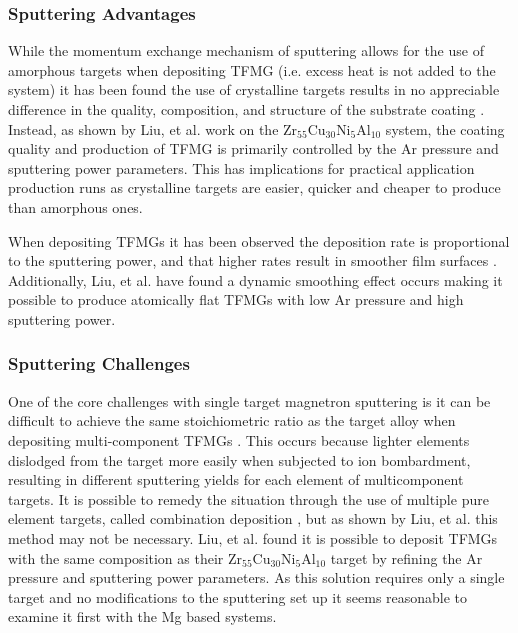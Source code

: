 \documentclass[draft,a4paper,12pt,oneside]{report}%
\begin{document}
\subsubsection{Sputtering Advantages}
While the momentum exchange mechanism of sputtering allows for the use of amorphous targets when depositing TFMG (i.e. excess heat is not added to the system) it has been found the use of crystalline targets results in no appreciable difference in the quality, composition, and structure of the substrate coating \cite{Liu2012}. Instead, as shown by Liu, et al. \cite{Liu2012} work on the Zr$_{55}$Cu$_{30}$Ni$_{5}$Al$_{10}$ system, the coating quality and production of TFMG is primarily controlled by the Ar pressure and sputtering power parameters. This has implications for practical application production runs as crystalline targets are easier, quicker and cheaper to produce than amorphous ones. 

When depositing TFMGs it has been observed the deposition rate is proportional to the sputtering power, and that higher rates result in smoother film surfaces \cite{Cao2013, Liu2012}. Additionally, Liu, et al. \cite{Liu2012} have found a dynamic smoothing effect occurs making it possible to produce atomically flat TFMGs with low Ar pressure and high sputtering power. 

\subsubsection{Sputtering Challenges}
One of the core challenges with single target magnetron sputtering is it can be difficult to achieve the same stoichiometric ratio as the target alloy when depositing multi-component TFMGs \cite{Cao2013, Liu2012, Kondoh2008}. This occurs because lighter elements dislodged from the target more easily when subjected to ion bombardment, resulting in different sputtering yields for each element of multicomponent targets. It is possible to remedy the situation through the use of multiple pure element targets, called combination deposition \cite{Deng2007, Qin2009, Apreutesei2014}, but as shown by Liu, et al. \cite{Liu2012} this method may not be necessary. Liu, et al. \cite{Liu2012} found it is possible to deposit TFMGs with the same composition as their Zr$_{55}$Cu$_{30}$Ni$_{5}$Al$_{10}$ target by refining the Ar pressure and sputtering power parameters. As this solution requires only a single target and no modifications to the sputtering set up it seems reasonable to examine it first with the Mg based systems.   
\end{document}
